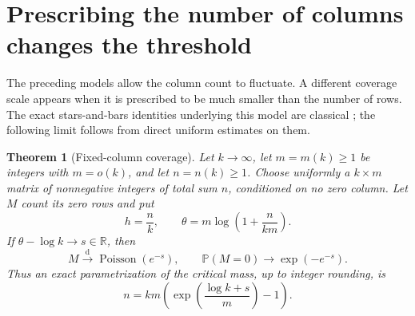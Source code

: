 \documentclass[11pt]{article}
\numberwithin{equation}{section}
\newtheorem{theorem}{Theorem}[section]
\theoremstyle{definition}
\theoremstyle{remark}
\newcommand{\Pp}{\mathbb P}
\DeclareMathOperator{\Pois}{Poisson}
\begin{document}
\section{Prescribing the number of columns changes the threshold}\label{mxc:sec:fixedcolumns}

The preceding models allow the column count to fluctuate. A different
coverage scale appears when it is prescribed to be much smaller than
the number of rows. The exact stars-and-bars identities underlying
this model are classical \cite[Proposition~28]{mpr2009}; the following
limit follows from direct uniform estimates on them.

\begin{theorem}[Fixed-column coverage]\label{mxc:thm:fixedcolumns}
Let $k\to\infty$, let $m=m(k)\ge1$ be integers with $m=o(k)$,
and let $n=n(k)\ge1$. Choose uniformly a $k\times m$ matrix of
nonnegative integers of total sum $n$, conditioned on no zero column.
Let $M$ count its zero rows and put
\begin{equation}\label{mxc:eq:theta}
 h=\frac nk,\qquad \theta=m\log\left(1+\frac{n}{km}\right).
\end{equation}
If $\theta-\log k\to s\in\mathbb R$, then
\[
 M\xrightarrow{\mathrm d}\Pois(e^{-s}),\qquad
 \Pp(M=0)\longrightarrow\exp(-e^{-s}).
\]
Thus an exact parametrization of the critical mass, up to integer
rounding, is
\begin{equation}\label{mxc:eq:fixedcritical}
 n=km\left(\exp\left(\frac{\log k+s}{m}\right)-1\right).
\end{equation}
\end{theorem}
\end{document}
